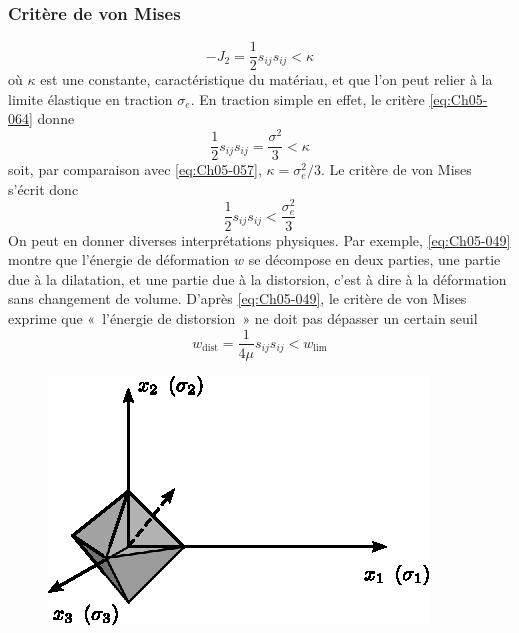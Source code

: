 \subsubsection{Critère de von Mises}
\begin{equation}
    -J_2 = \frac{1}{2} s_{ij} s_{ij} < \kappa
    \label{eq:Ch05-064}
\end{equation}
où $\kappa$ est une constante, caractéristique du matériau, et que l'on peut relier à la limite élastique en traction $\sigma_e$.
En traction simple en effet, le critère \eqref{eq:Ch05-064} donne 
\begin{equation*}
    \frac{1}{2} s_{ij} s_{ij} = \frac{\sigma^2}{3} < \kappa
\end{equation*}
soit, par comparaison avec \eqref{eq:Ch05-057}, $\kappa = \sigma_e^2/3$.
Le critère de von Mises s'écrit donc 
\begin{equation}
    \frac{1}{2} s_{ij} s_{ij} < \frac{\sigma_e^2}{3}
    \label{eq:Ch05-065}
\end{equation}
On peut en donner diverses interprétations physiques.
Par exemple, \eqref{eq:Ch05-049} montre que l'énergie de déformation $w$ se décompose en deux parties, une partie due à la dilatation, et une partie due à la distorsion, c'est à dire à la déformation sans changement de volume.
D'après \eqref{eq:Ch05-049}, le critère de von Mises exprime que «~l'énergie de distorsion~» ne doit pas dépasser un certain seuil 
\begin{equation}
    w_{\mathrm{dist}} = \frac{1}{4\mu} s_{ij} s_{ij} < w_{\mathrm{lim}}
    \label{eq:Ch05-065b}
\end{equation}
\begin{figure}
    \begin{center}
        \includegraphics{../images/T1_Ch05-04}
    \end{center}
\end{figure}
